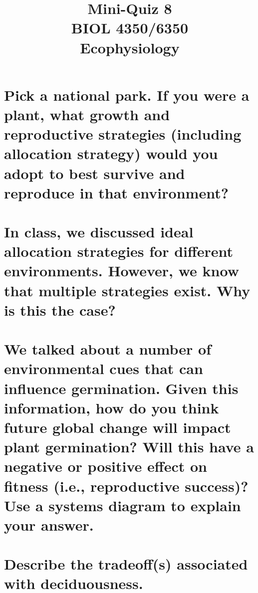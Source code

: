 \documentclass[12pt, notitlepage]{article}   	%
\title{
	\textbf{
		Mini-Quiz 8
	} \\
	\large BIOL 4350/6350 \\
	\large Ecophysiology \\
}
\date{\vspace{-5ex}}
\def\wl{\par \vspace{\baselineskip}}
\begin{document}
{\selectfont %

\maketitle

\section{\small{Pick a national park. If you were a plant, what growth and reproductive strategies (including allocation strategy)
would you adopt to best survive and reproduce in that environment?}}
\wl
\wl
\wl
\wl
\wl
\wl
\wl
\wl
\wl
\wl
\wl
\wl
\wl
\wl

\section{\small{In class, we discussed ideal allocation strategies for different environments. 
However, we know that multiple strategies exist. Why is this the case?}}

\newpage

\section{\small{We talked about a number of environmental cues that can influence germination. 
Given this information, how do you think future global change will impact plant germination? 
Will this have a negative or positive effect on fitness (i.e., reproductive success)?
Use a systems diagram to explain your answer.}}

\wl
\wl
\wl
\wl
\wl
\wl
\wl
\wl
\wl
\wl
\wl
\wl
\wl
\wl

\section{\small{Describe the tradeoff(s) associated with deciduousness.}}


} %
\end{document}
